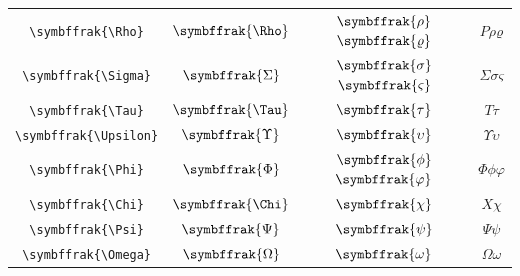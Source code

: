\documentclass[12pt,a4paper]{article}
\begin{document}
\begin{longtable}{|c|c|c|c|}
\verb|\symbffrak{\Rho}| & $\symbffrak{\Rho}$ & $\symbffrak{\rho}$ $\symbffrak{\varrho}$ & $ Ρ 𝜌 𝜚 $ \\
\verb|\symbffrak{\Sigma}| & $\symbffrak{\Sigma}$ & $\symbffrak{\sigma}$ $\symbffrak{\varsigma}$ & $ Σ 𝜎 𝜍 $ \\
\verb|\symbffrak{\Tau}| & $\symbffrak{\Tau}$ & $\symbffrak{\tau}$ & $ Τ 𝜏 $ \\
\verb|\symbffrak{\Upsilon}| & $\symbffrak{\Upsilon}$ & $\symbffrak{\upsilon}$ & $ Υ 𝜐 $ \\
\verb|\symbffrak{\Phi}| & $\symbffrak{\Phi}$ & $\symbffrak{\phi}$ $\symbffrak{\varphi}$ & $ Φ 𝜙 𝜑 $ \\
\verb|\symbffrak{\Chi}| & $\symbffrak{\Chi}$ & $\symbffrak{\chi}$ & $ Χ 𝜒 $ \\
\verb|\symbffrak{\Psi}| & $\symbffrak{\Psi}$ & $\symbffrak{\psi}$ & $ Ψ 𝜓 $ \\
\verb|\symbffrak{\Omega}| & $\symbffrak{\Omega}$ & $\symbffrak{\omega}$ & $ Ω 𝜔 $ \\
\hline
\end{longtable}
\end{document}

